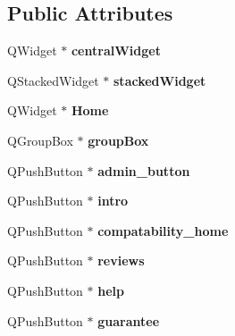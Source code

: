 \subsection*{Public Attributes}
\begin{DoxyCompactItemize}
\item 
\mbox{\label{class_ui___main_window_a30075506c2116c3ed4ff25e07ae75f81}} 
Q\+Widget $\ast$ {\bfseries central\+Widget}
\item 
\mbox{\label{class_ui___main_window_a8d440a6df1de0bc57afcdda7476d8f19}} 
Q\+Stacked\+Widget $\ast$ {\bfseries stacked\+Widget}
\item 
\mbox{\label{class_ui___main_window_a3ec68d4c89c6dcd4fa343bfc486ce351}} 
Q\+Widget $\ast$ {\bfseries Home}
\item 
\mbox{\label{class_ui___main_window_aef7cb3be8cecfc9aaf98f036a98781ce}} 
Q\+Group\+Box $\ast$ {\bfseries group\+Box}
\item 
\mbox{\label{class_ui___main_window_a29d4f23d897d76f4722e7702cf290e96}} 
Q\+Push\+Button $\ast$ {\bfseries admin\+\_\+button}
\item 
\mbox{\label{class_ui___main_window_aee9f42af99553b2f02ca79b5743785b4}} 
Q\+Push\+Button $\ast$ {\bfseries intro}
\item 
\mbox{\label{class_ui___main_window_ac2a962d000aca877f10f86d0280d6918}} 
Q\+Push\+Button $\ast$ {\bfseries compatability\+\_\+home}
\item 
\mbox{\label{class_ui___main_window_a9b06eeec5a6f87bcd5734ef0e54866d5}} 
Q\+Push\+Button $\ast$ {\bfseries reviews}
\item 
\mbox{\label{class_ui___main_window_ac7278e03d5f64c64ceff38f64edfced1}} 
Q\+Push\+Button $\ast$ {\bfseries help}
\item 
\mbox{\label{class_ui___main_window_a85fdf25efb0f619da072b603d1dbe9e8}} 
Q\+Push\+Button $\ast$ {\bfseries guarantee}

\end{DoxyCompactItemize}
